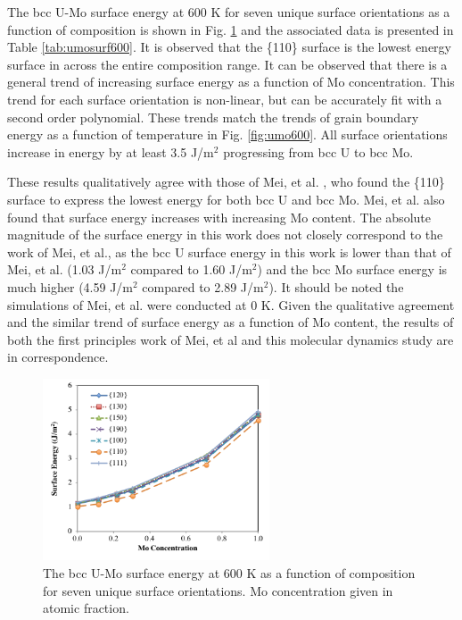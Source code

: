 \documentclass[review]{elsarticle}
\providecommand{\DIFaddbeginFL}{} %
\providecommand{\DIFaddendFL}{} %
\providecommand{\DIFdelbeginFL}{} %
\providecommand{\DIFdelendFL}{} %
\newcommand{\DIFscaledelfig}{0.5}
\newlength{\DIFdelgraphicswidth} %
\newlength{\DIFdelgraphicsheight} %
\newcommand{\DIFaddincludegraphics}[2][]{{\color{blue}\fbox{\DIFOincludegraphics[#1]{#2}}}} %
\newcommand{\DIFdelincludegraphics}[2][]{%
\sbox{\DIFdelgraphicsbox}{\DIFOincludegraphics[#1]{#2}}%
\settoboxwidth{\DIFdelgraphicswidth}{\DIFdelgraphicsbox} %
\settoboxtotalheight{\DIFdelgraphicsheight}{\DIFdelgraphicsbox} %
\scalebox{\DIFscaledelfig}{%
\parbox[b]{\DIFdelgraphicswidth}{\usebox{\DIFdelgraphicsbox}\\[-\baselineskip] \rule{\DIFdelgraphicswidth}{0em}}\llap{\resizebox{\DIFdelgraphicswidth}{\DIFdelgraphicsheight}{%
\setlength{\unitlength}{\DIFdelgraphicswidth}%
\begin{picture}(1,1)%
\thicklines\linethickness{2pt} %
{\color[rgb]{1,0,0}\put(0,0){\framebox(1,1){}}}%
{\color[rgb]{1,0,0}\put(0,0){\line( 1,1){1}}}%
{\color[rgb]{1,0,0}\put(0,1){\line(1,-1){1}}}%
\end{picture}%
}\hspace*{3pt}}} %
} %
\DeclareRobustCommand{\DIFaddbeginFL}{\DIFOaddbeginFL \let\includegraphics\DIFaddincludegraphics} %
\DeclareRobustCommand{\DIFaddendFL}{\DIFOaddendFL \let\includegraphics\DIFOincludegraphics} %
\DeclareRobustCommand{\DIFdelbeginFL}{\DIFOdelbeginFL \let\includegraphics\DIFdelincludegraphics} %
\DeclareRobustCommand{\DIFdelendFL}{\DIFOaddendFL \let\includegraphics\DIFOincludegraphics} %
\begin{document}
The bcc U-Mo surface energy at 600 K for seven unique surface orientations as a function of composition is shown in Fig. \ref{fig:umosurf600} and the associated data is presented in Table \ref{tab:umosurf600}. It is observed that the \{110\} surface is the lowest energy surface in across the entire composition range. It can be observed that there is a general trend of increasing surface energy as a function of Mo concentration. This trend for each surface orientation is non-linear, but can be accurately fit with a second order polynomial. These trends match the trends of grain boundary energy as a function of temperature in Fig. \ref{fig:umo600}. All surface orientations increase in energy by at least 3.5 J/m$^{2}$ progressing from bcc U to bcc Mo. 

These results qualitatively agree with those of Mei, et al. \cite{zhigang2018}, who found the \{110\} surface to express the lowest energy for both bcc U and bcc Mo. Mei, et al. also found that surface energy increases with increasing Mo content. The absolute magnitude of the surface energy in this work does not closely correspond to the work of Mei, et al., as the bcc U surface energy in this work is lower than that of Mei, et al. (1.03 J/m$^{2}$ compared to 1.60 J/m$^{2}$) and the bcc Mo surface energy is much higher (4.59 J/m$^{2}$ compared to 2.89 J/m$^{2}$). It should be noted the simulations of Mei, et al. were conducted at 0 K. Given the qualitative agreement and the similar trend of surface energy as a function of Mo content, the results of both the first principles work of Mei, et al \cite{zhigang2018} and this molecular dynamics study are in correspondence.

\begin{figure}[h]
 \centering
 \DIFdelbeginFL %
\DIFdelendFL \DIFaddbeginFL \includegraphics[width=0.6\textwidth]{umosurf600A.png} 
 \DIFaddendFL \caption{The bcc U-Mo surface energy at 600 K as a function of composition for seven unique surface orientations. Mo concentration given in atomic fraction.}
 \label{fig:umosurf600}
\end{figure}
\end{document}
